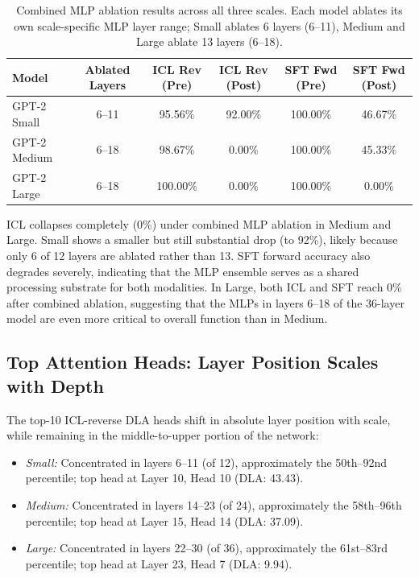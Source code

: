 \documentclass[11pt]{article}
\begin{document}
\begin{table}[H]
\centering
\caption{Combined MLP ablation results across all three scales. Each model
ablates its own scale-specific MLP layer range; Small ablates 6 layers (6--11),
Medium and Large ablate 13 layers (6--18).}
\label{tab:mlp_combined}
\begin{tabular}{lccccc}
\toprule
\textbf{Model} & \textbf{Ablated Layers} & \textbf{ICL Rev (Pre)} & \textbf{ICL Rev (Post)} & \textbf{SFT Fwd (Pre)} & \textbf{SFT Fwd (Post)} \\
\midrule
GPT-2 Small  & 6--11 & 95.56\% & 92.00\% & 100.00\% & 46.67\% \\
GPT-2 Medium & 6--18 & 98.67\% &  0.00\% & 100.00\% & 45.33\% \\
GPT-2 Large  & 6--18 & 100.00\% & 0.00\% & 100.00\% &  0.00\% \\
\bottomrule
\end{tabular}
\end{table}

ICL collapses completely (0\%) under combined MLP ablation in Medium and Large.
Small shows a smaller but still substantial drop (to 92\%), likely because only
6 of 12 layers are ablated rather than 13. SFT forward accuracy also degrades
severely, indicating that the MLP ensemble serves as a shared processing
substrate for both modalities. In Large, both ICL and SFT reach 0\% after
combined ablation, suggesting that the MLPs in layers 6--18 of the 36-layer
model are even more critical to overall function than in Medium.

\subsection{Top Attention Heads: Layer Position Scales with Depth}

The top-10 ICL-reverse DLA heads shift in absolute layer position with scale,
while remaining in the middle-to-upper portion of the network:

\begin{itemize}
  \item \textit{Small:} Concentrated in layers 6--11 (of 12), approximately the
  50th--92nd percentile; top head at Layer 10, Head 10 (DLA: 43.43).
  \item \textit{Medium:} Concentrated in layers 14--23 (of 24), approximately
  the 58th--96th percentile; top head at Layer 15, Head 14 (DLA: 37.09).
  \item \textit{Large:} Concentrated in layers 22--30 (of 36), approximately
  the 61st--83rd percentile; top head at Layer 23, Head 7 (DLA: 9.94).
\end{itemize}
\end{document}
